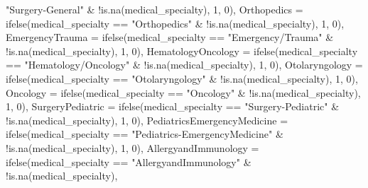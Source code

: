 \documentclass[
]{article}
\newenvironment{Shaded}{\begin{snugshade}}{\end{snugshade}}
\newcommand{\AttributeTok}[1]{\textcolor[rgb]{0.77,0.63,0.00}{#1}}
\newcommand{\DecValTok}[1]{\textcolor[rgb]{0.00,0.00,0.81}{#1}}
\newcommand{\FunctionTok}[1]{\textcolor[rgb]{0.00,0.00,0.00}{#1}}
\newcommand{\NormalTok}[1]{#1}
\newcommand{\SpecialCharTok}[1]{\textcolor[rgb]{0.00,0.00,0.00}{#1}}
\newcommand{\StringTok}[1]{\textcolor[rgb]{0.31,0.60,0.02}{#1}}
\begin{document}
\begin{Shaded}
\begin{Highlighting}[]
            \StringTok{"Surgery{-}General"} \SpecialCharTok{\&} \SpecialCharTok{!}\FunctionTok{is.na}\NormalTok{(medical\_specialty),}
            \DecValTok{1}\NormalTok{, }\DecValTok{0}\NormalTok{), }\AttributeTok{Orthopedics =} \FunctionTok{ifelse}\NormalTok{(medical\_specialty }\SpecialCharTok{==}
            \StringTok{"Orthopedics"} \SpecialCharTok{\&} \SpecialCharTok{!}\FunctionTok{is.na}\NormalTok{(medical\_specialty),}
            \DecValTok{1}\NormalTok{, }\DecValTok{0}\NormalTok{), }\AttributeTok{EmergencyTrauma =} \FunctionTok{ifelse}\NormalTok{(medical\_specialty }\SpecialCharTok{==}
            \StringTok{"Emergency/Trauma"} \SpecialCharTok{\&} \SpecialCharTok{!}\FunctionTok{is.na}\NormalTok{(medical\_specialty),}
            \DecValTok{1}\NormalTok{, }\DecValTok{0}\NormalTok{), }\AttributeTok{HematologyOncology =} \FunctionTok{ifelse}\NormalTok{(medical\_specialty }\SpecialCharTok{==}
            \StringTok{"Hematology/Oncology"} \SpecialCharTok{\&} \SpecialCharTok{!}\FunctionTok{is.na}\NormalTok{(medical\_specialty),}
            \DecValTok{1}\NormalTok{, }\DecValTok{0}\NormalTok{), }\AttributeTok{Otolaryngology =} \FunctionTok{ifelse}\NormalTok{(medical\_specialty }\SpecialCharTok{==}
            \StringTok{"Otolaryngology"} \SpecialCharTok{\&} \SpecialCharTok{!}\FunctionTok{is.na}\NormalTok{(medical\_specialty),}
            \DecValTok{1}\NormalTok{, }\DecValTok{0}\NormalTok{), }\AttributeTok{Oncology =} \FunctionTok{ifelse}\NormalTok{(medical\_specialty }\SpecialCharTok{==}
            \StringTok{"Oncology"} \SpecialCharTok{\&} \SpecialCharTok{!}\FunctionTok{is.na}\NormalTok{(medical\_specialty),}
            \DecValTok{1}\NormalTok{, }\DecValTok{0}\NormalTok{), }\AttributeTok{SurgeryPediatric =} \FunctionTok{ifelse}\NormalTok{(medical\_specialty }\SpecialCharTok{==}
            \StringTok{"Surgery{-}Pediatric"} \SpecialCharTok{\&} \SpecialCharTok{!}\FunctionTok{is.na}\NormalTok{(medical\_specialty),}
            \DecValTok{1}\NormalTok{, }\DecValTok{0}\NormalTok{), }\AttributeTok{PediatricsEmergencyMedicine =} \FunctionTok{ifelse}\NormalTok{(medical\_specialty }\SpecialCharTok{==}
            \StringTok{"Pediatrics{-}EmergencyMedicine"} \SpecialCharTok{\&} \SpecialCharTok{!}\FunctionTok{is.na}\NormalTok{(medical\_specialty),}
            \DecValTok{1}\NormalTok{, }\DecValTok{0}\NormalTok{), }\AttributeTok{AllergyandImmunology =} \FunctionTok{ifelse}\NormalTok{(medical\_specialty }\SpecialCharTok{==}
            \StringTok{"AllergyandImmunology"} \SpecialCharTok{\&} \SpecialCharTok{!}\FunctionTok{is.na}\NormalTok{(medical\_specialty),}

\end{Highlighting}
\end{Shaded}
\end{document}
